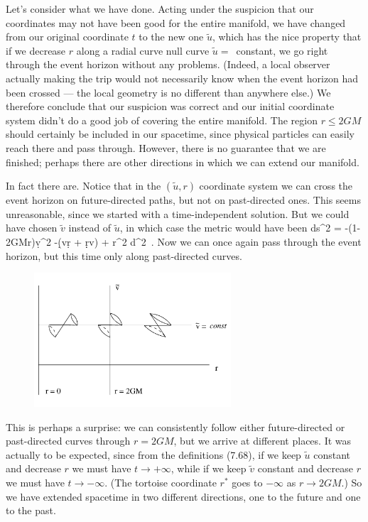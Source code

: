 \documentclass[12pt]{article}
\begin{document}
Let's consider what we have done.  Acting under the suspicion that
our coordinates may not have been good for the entire manifold, we
have changed from our original coordinate $t$ to the new one $\tilde u$,
which has the nice property that if we decrease $r$ along a radial
curve null curve $\tilde u =$~constant, we go right through the
event horizon without any problems.  (Indeed, a local observer actually
making the trip would not necessarily know when the event horizon had
been crossed --- the local geometry is 
no different than anywhere else.)  We therefore
conclude that our suspicion was correct and our initial coordinate
system didn't do a good job of covering the entire manifold.  The region
$r\leq 2GM$ should certainly be included in our spacetime, since
physical particles can easily reach there and pass through.  However,
there is no guarantee that we are finished; perhaps there are other
directions in which we can extend our manifold.

In fact there are.  Notice that in the $(\tilde u, r)$ coordinate
system we can cross the event horizon on future-directed paths, but
not on past-directed ones.  This seems unreasonable, since we started
with a time-independent solution.  But we could have chosen $\tilde v$
instead of $\tilde u$, in which case the metric would have been
\be
  ds^2 = -\left(1-{{2GM}\over r}\right)\d{\tilde v}^2
  -(\d\tilde v\d r + \d r\d\tilde v) + r^2 d\Omega^2\ .\label{7.72}
\ee
Now we can once again pass through the event horizon, but this time
only along past-directed curves.

\begin{figure}
  \centerline{
  \includegraphics[height=5cm]{pdf/seven13}}
\end{figure}

This is perhaps a surprise: we can consistently follow either 
future-directed or past-directed curves through $r=2GM$, but we
arrive at different places.  It was actually to be expected, since
from the definitions (7.68), if we keep $\tilde u$ constant and decrease
$r$ we must have $t\rightarrow +\infty$, while if we keep
$\tilde v$ constant and decrease $r$ we must have $t\rightarrow -\infty$.
(The tortoise coordinate $r^*$ goes to $-\infty$ as $r\rightarrow 2GM$.)
So we have extended spacetime in two different directions, one to
the future and one to the past.
\end{document}
